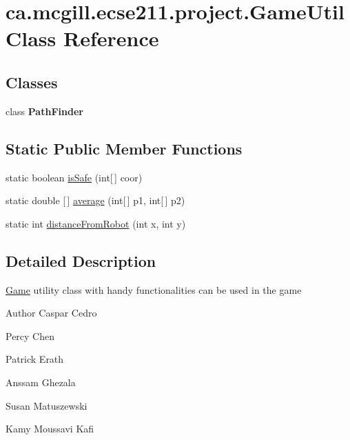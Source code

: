 \hypertarget{classca_1_1mcgill_1_1ecse211_1_1project_1_1_game_util}{}\section{ca.\+mcgill.\+ecse211.\+project.\+Game\+Util Class Reference}
\label{classca_1_1mcgill_1_1ecse211_1_1project_1_1_game_util}
\subsection*{Classes}
\begin{DoxyCompactItemize}
\item 
class {\bfseries Path\+Finder}
\end{DoxyCompactItemize}
\subsection*{Static Public Member Functions}
\begin{DoxyCompactItemize}
\item 
static boolean \hyperlink{classca_1_1mcgill_1_1ecse211_1_1project_1_1_game_util_a4b657445545fb1a814b6699724d72042}{is\+Safe} (int\mbox{[}$\,$\mbox{]} coor)
\item 
static double \mbox{[}$\,$\mbox{]} \hyperlink{classca_1_1mcgill_1_1ecse211_1_1project_1_1_game_util_ae5c5c445ab84516991219ca3783fcaa4}{average} (int\mbox{[}$\,$\mbox{]} p1, int\mbox{[}$\,$\mbox{]} p2)
\item 
static int \hyperlink{classca_1_1mcgill_1_1ecse211_1_1project_1_1_game_util_a16770a5be37a6b27cc8c87e76e6d7d08}{distance\+From\+Robot} (int x, int y)
\end{DoxyCompactItemize}


\subsection{Detailed Description}
\hyperlink{enumca_1_1mcgill_1_1ecse211_1_1project_1_1_game}{Game} utility class with handy functionalities can be used in the game

\begin{DoxyAuthor}{Author}
Caspar Cedro 

Percy Chen 

Patrick Erath 

Anssam Ghezala 

Susan Matuszewski 

Kamy Moussavi Kafi 
\end{DoxyAuthor}


